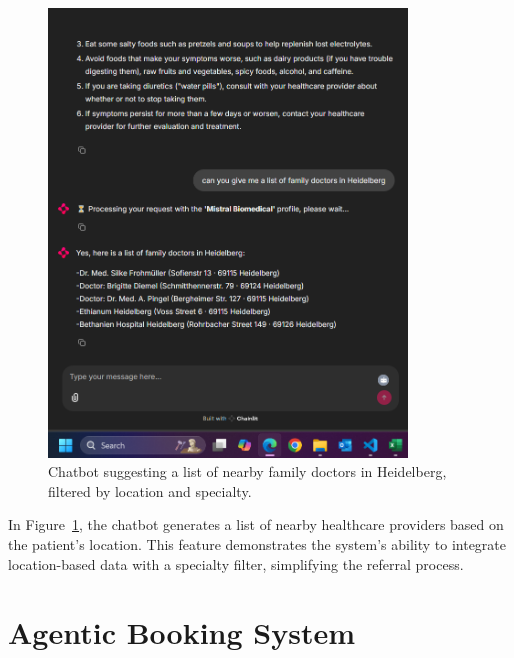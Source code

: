 \begin{figure}[htbp]
    \centering
    \includegraphics[width=0.85\textwidth]{Images/doctorrecom.png}
    \caption{Chatbot suggesting a list of nearby family doctors in Heidelberg, filtered by location and specialty.}
    \label{fig:doctor-recom}
\end{figure}
In Figure~\ref{fig:doctor-recom}, the chatbot generates a list of nearby healthcare providers based on the patient’s location. This feature demonstrates the system’s ability to integrate location-based data with a specialty filter, simplifying the referral process.


\section{Agentic Booking System}

